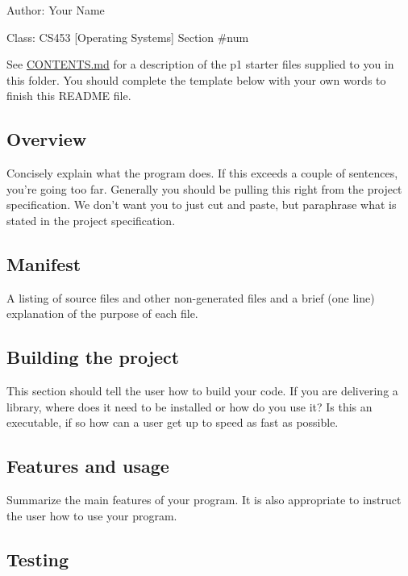 
\begin{DoxyItemize}
\item Author\-: Your Name
\item Class\-: C\-S453 \mbox{[}Operating Systems\mbox{]} Section \#num
\end{DoxyItemize}

See \hyperlink{CONTENTS_8md}{C\-O\-N\-T\-E\-N\-T\-S.\-md} for a description of the p1 starter files supplied to you in this folder. You should complete the template below with your own words to finish this R\-E\-A\-D\-M\-E file.

\subsection*{Overview}

Concisely explain what the program does. If this exceeds a couple of sentences, you're going too far. Generally you should be pulling this right from the project specification. We don't want you to just cut and paste, but paraphrase what is stated in the project specification.

\subsection*{Manifest}

A listing of source files and other non-\/generated files and a brief (one line) explanation of the purpose of each file.

\subsection*{Building the project}

This section should tell the user how to build your code. If you are delivering a library, where does it need to be installed or how do you use it? Is this an executable, if so how can a user get up to speed as fast as possible.

\subsection*{Features and usage}

Summarize the main features of your program. It is also appropriate to instruct the user how to use your program.

\subsection*{Testing}

